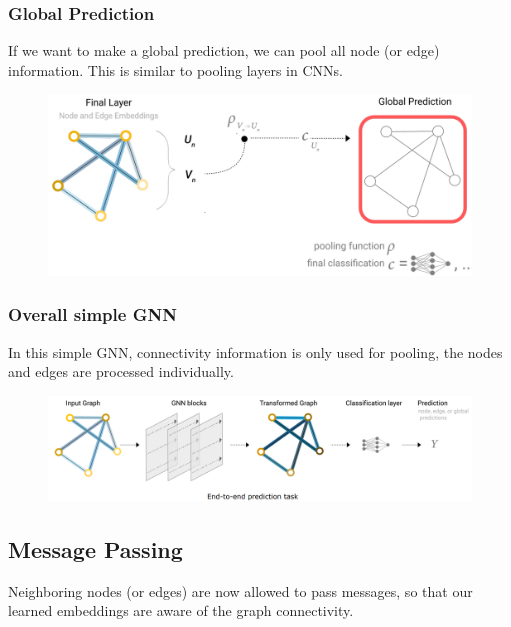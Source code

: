 \subsubsection*{Global Prediction}

If we want to make a global prediction, we can pool all node (or edge) information.
This is similar to pooling layers in CNNs.
\begin{figure}[!h]
    \includegraphics[width = \columnwidth]{figures/GraphNeuralNetworks1/GlobalPrediction.png}
\end{figure}

\subsubsection{Overall simple GNN}
In this simple GNN, connectivity information is only used for pooling, the nodes and edges are processed individually.
\begin{figure}[!h]
    \includegraphics[width = \columnwidth]{figures/GraphNeuralNetworks1/OverallSimpleGNN.png}
\end{figure}

\subsection{Message Passing}
Neighboring nodes (or edges) are now allowed to pass messages, so that our learned embeddings are aware of the graph connectivity.

